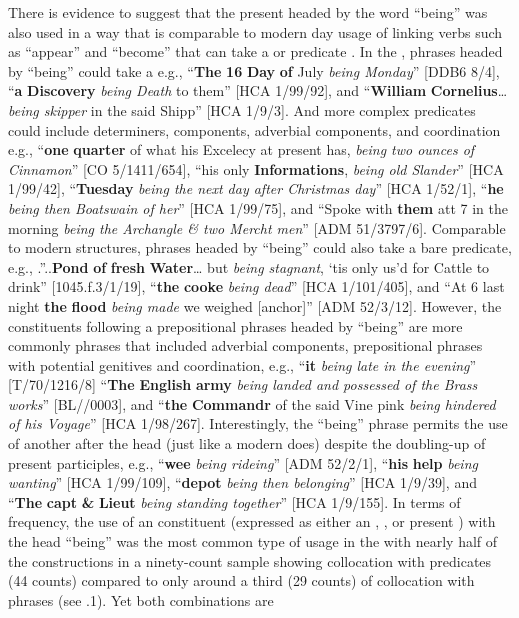 There is evidence to suggest that the present  headed by the word “being” was also used in a way that is comparable to modern day usage of linking verbs such as “appear” and “become” that can take a  or predicate . In the ,  phrases headed by “being” could take a  e.g., “\textbf{The} \textbf{16} \textbf{Day} \textbf{of} July \textit{being Monday}” [DDB6 8/4], “\textbf{a} \textbf{Discovery} \textit{being Death} to them” [HCA 1/99/92], and “\textbf{William} \textbf{Cornelius}…\textit{being skipper} in the said Shipp” [HCA 1/9/3]. And more complex  predicates could include determiners,  components, adverbial components, and coordination e.g., “\textbf{one} \textbf{quarter} of what his Excelecy at present has, \textit{being two ounces of Cinnamon}” [CO 5/1411/654], “his only \textbf{Informations}, \textit{being old Slander}” [HCA 1/99/42], “\textbf{Tuesday} \textit{being the next day after Christmas day}” [HCA 1/52/1], “\textbf{he} \textit{being then Boatswain of her}” [HCA 1/99/75], and “Spoke with \textbf{them} att 7 in the morning \textit{being the Archangle \& two Mercht men}” [ADM 51/3797/6]. Comparable to modern  structures,  phrases headed by “being” could also take a bare  predicate, e.g., .”..\textbf{Pond} \textbf{of} \textbf{fresh} \textbf{Water}… but \textit{being stagnant}, ‘tis only us’d for Cattle to drink” [1045.f.3/1/19], “\textbf{the} \textbf{cooke} \textit{being dead}” [HCA 1/101/405], and “At 6 last night \textbf{the} \textbf{flood} \textit{being made} we weighed [anchor]” [ADM 52/3/12]. However, the  constituents following a prepositional phrases headed by “being” are more commonly  phrases that included adverbial components, prepositional phrases with potential genitives and coordination, e.g., “\textbf{it} \textit{being late in the evening}” [T/70/1216/8] “\textbf{The} \textbf{English} \textbf{army} \textit{being landed and possessed of the Brass works}” [BL/\citealt{Egerton2395}/0003], and “\textbf{the} \textbf{Commandr} of the said Vine pink \textit{being hindered of his Voyage}” [HCA 1/98/267]. Interestingly, the “being” phrase permits the use of another   after the  head (just like a modern  does) despite the doubling-up of present participles, e.g., “\textbf{wee} \textit{being rideing}” [ADM 52/2/1], “\textbf{his} \textbf{help} \textit{being wanting}” [HCA 1/99/109], “\textbf{depot} \textit{being then belonging}” [HCA 1/9/39], and “\textbf{The} \textbf{capt} \textbf{\&} \textbf{Lieut} \textit{being standing together}” [HCA 1/9/155]. In terms of frequency, the use of an  constituent (expressed as either an , , or present ) with the  head “being” was the most common type of usage in the  with nearly half of the constructions in a ninety-count sample showing collocation with  predicates (44 counts) compared to only around a third (29 counts) of collocation with  phrases (see .1). Yet both combinations are 